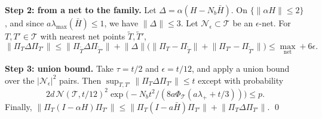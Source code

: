 \documentclass[11pt]{article}
\theoremstyle{definition}
\theoremstyle{remark}
\newcommand{\norm}[1]{\lVert #1\rVert}
\newcommand{\lmax}{\lambda_{\max}}
\newcommand{\Hb}{\bar H}
\newcommand{\T}{\mathcal T}
\begin{document}
\textbf{Step 2: from a net to the family.} Let $\Delta=\alpha(H-N_b\Hb)$. On $\{\norm{\alpha H}\leq2\}$, and since
$a\lmax(\Hb)\leq1$, we have $\norm\Delta\leq3$. Let $\mathcal N_\epsilon\subset\T$ be an $\epsilon$-net. For
$T,T'\in\T$ with nearest net points $\tilde T,\tilde T'$,
\[
\norm{\Pi_T\Delta\Pi_{T'}}\leq\norm{\Pi_{\tilde T}\Delta\Pi_{\tilde T'}}+\norm\Delta\big(\norm{\Pi_T-\Pi_{\tilde T}}+\norm{\Pi_{T'}-\Pi_{\tilde T'}}\big)\leq\max_{\mathrm{net}}+6\epsilon .
\]

\textbf{Step 3: union bound.} Take $\tau=t/2$ and $\epsilon=t/12$, and apply a union bound over the
$|\mathcal N_\epsilon|^2$ pairs. Then $\sup_{T,T'}\norm{\Pi_T\Delta\Pi_{T'}}\leq t$ except with probability
\[
2d\,\mathcal N(\T,t/12)^2\exp\big(-N_bt^2/(8a\Phi_\T(a\lambda_++t/3))\big)\leq p .
\]
Finally,
$\norm{\Pi_T(I-\alpha H)\Pi_{T'}}\leq\norm{\Pi_T(I-a\Hb)\Pi_{T'}}+\norm{\Pi_T\Delta\Pi_{T'}}$.
\qed



\end{document}
